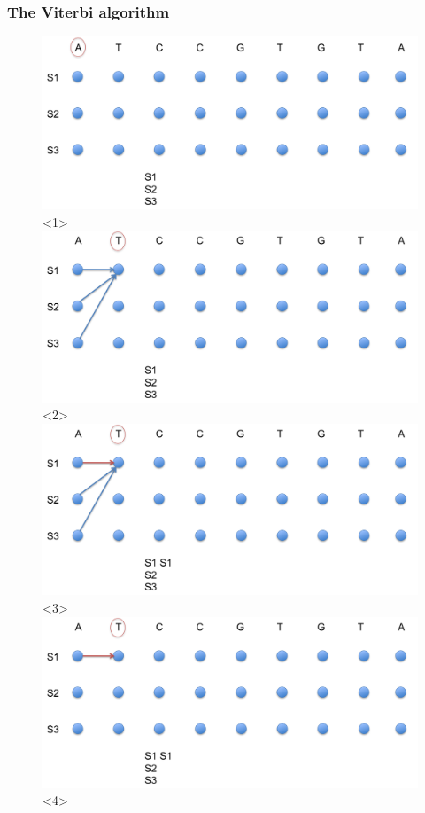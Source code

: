 \documentclass{beamer}[12pt]
\begin{document}
\begin{frame}
\frametitle{The Viterbi algorithm}

		\begin{figure}[h]
			\centering
			\includegraphics[width=1.0\textwidth]{../picturesforthepresentation/Viterbi1.png}<1>
			\includegraphics[width=1.0\textwidth]{../picturesforthepresentation/Viterbi2.png}<2>
			\includegraphics[width=1.0\textwidth]{../picturesforthepresentation/Viterbi3.png}<3>
			\includegraphics[width=1.0\textwidth]{../picturesforthepresentation/Viterbi4.png}<4>

\end{figure}
\end{frame}
\end{document}
